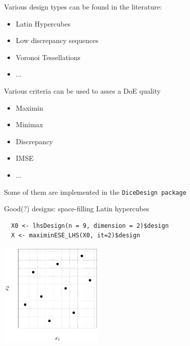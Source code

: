 \documentclass{beamer}
\begin{document}
\begin{frame}{}
Various design types can be found in the literature:
\begin{itemize}
	\item Latin Hypercubes
	\item Low discrepancy sequences
	\item Voronoi Tessellations
	\item ...
\end{itemize}
Various criteria can be used to asses a DoE quality
\begin{itemize}
	\item Maximin
	\item Minimax
	\item Discrepancy
	\item IMSE
	\item ...
\end{itemize}
Some of them are implemented in the \texttt{DiceDesign package}
\end{frame}


\begin{frame}[fragile]{Good(?) designs: space-filling Latin hypercubes}
  \begin{verbatim}
  X0 <- lhsDesign(n = 9, dimension = 2)$design
  X <- maximinESE_LHS(X0, it=2)$design
  \end{verbatim}
  \begin{center}
  \includegraphics[width=5cm]{figures/R/DoE_LHSmaximin}
  \end{center}
\end{frame}
\end{document}
